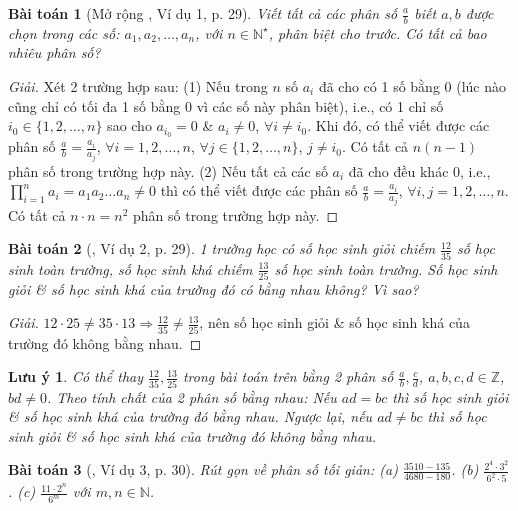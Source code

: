 \documentclass{article}
\newtheorem{baitoan}{Bài toán}
\newtheorem{luuy}{Lưu ý}
\begin{document}
\begin{baitoan}[Mở rộng \cite{SBT_Toan_6_Canh_Dieu_tap_2}, Ví dụ 1, p. 29]
	Viết tất cả các phân số $\frac{a}{b}$ biết $a,b$ được chọn trong các số: $a_1,a_2,\ldots,a_n$, với $n\in\mathbb{N}^\star$, phân biệt cho trước. Có tất cả bao nhiêu phân số?
\end{baitoan}

\begin{proof}[Giải]
	Xét 2 trường hợp sau: (1) Nếu trong $n$ số $a_i$ đã cho có 1 số bằng $0$ (lúc nào cũng chỉ có tối đa 1 số bằng $0$ vì các số này phân biệt), i.e., có 1 chỉ số $i_0\in\{1,2,\ldots,n\}$ sao cho $a_{i_0} = 0$ \& $a_i\ne0$, $\forall i\ne i_0$.  Khi đó, có thể viết được các phân số $\frac{a}{b} = \frac{a_i}{a_j}$, $\forall i = 1,2,\ldots,n$, $\forall j\in\{1,2,\ldots,n\}$, $j\ne i_0$. Có tất cả $n(n - 1)$ phân số trong trường hợp này. (2) Nếu tất cả các số $a_i$ đã cho đều khác $0$, i.e., $\prod_{i=1}^n a_i = a_1a_2\ldots a_n\ne0$ thì có thể viết được các phân số $\frac{a}{b} = \frac{a_i}{a_j}$, $\forall i,j = 1,2,\ldots,n$. Có tất cả $n\cdot n = n^2$ phân số trong trường hợp này.
\end{proof}

\begin{baitoan}[\cite{SBT_Toan_6_Canh_Dieu_tap_2}, Ví dụ 2, p. 29]
	1 trường học có số học sinh giỏi chiếm $\frac{12}{35}$ số học sinh toàn trường, số học sinh khá chiếm $\frac{13}{25}$ số học sinh toàn trường. Số học sinh giỏi \& số học sinh khá của trường đó có bằng nhau không? Vì sao?
\end{baitoan}

\begin{proof}[Giải]
	$12\cdot25\ne35\cdot13\Rightarrow\frac{12}{35}\ne\frac{13}{25}$, nên số học sinh giỏi \& số học sinh khá của trường đó không bằng nhau.
\end{proof}

\begin{luuy}
	Có thể thay $\frac{12}{35},\frac{13}{25}$ trong bài toán trên bằng 2 phân số $\frac{a}{b},\frac{c}{d}$, $a,b,c,d\in\mathbb{Z}$, $bd\ne0$. Theo tính chất của 2 phân số bằng nhau: Nếu $ad = bc$ thì số học sinh giỏi \& số học sinh khá của trường đó bằng nhau. Ngược lại, nếu $ad\ne bc$ thì số học sinh giỏi \& số học sinh khá của trường đó không bằng nhau.
\end{luuy}

\begin{baitoan}[\cite{SBT_Toan_6_Canh_Dieu_tap_2}, Ví dụ 3, p. 30]
	Rút gọn về phân số tối giản: (a) $\frac{3510 - 135}{4680 - 180}$. (b) $\frac{2^4\cdot3^2}{6^2\cdot5}$. (c) $\frac{11\cdot2^n}{6^m}$ với $m,n\in\mathbb{N}$.
\end{baitoan}
\end{document}
